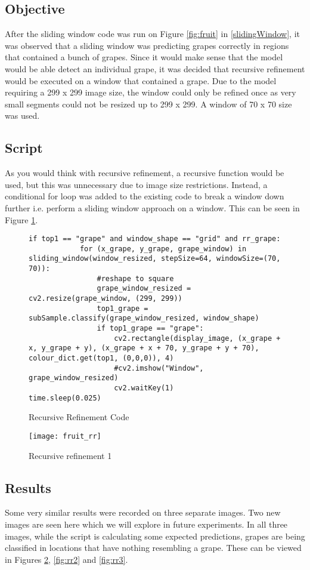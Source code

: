 \tocless\subsection{Objective}
After the sliding window code was run on Figure \ref{fig:fruit} in \ref{slidingWindow},
it was observed that a sliding window was predicting grapes correctly in
regions that contained a bunch of grapes. Since it would make sense that the
model would be able detect an individual grape, it was decided that
recursive refinement would be executed on a window that contained a grape. Due to the model
requiring a 299 x 299 image size, the window could only be refined once as
very small segments could not be resized up to 299 x 299. A window of 70 x 70 size was used.

\tocless\subsection{Script}
As you would think with recursive refinement, a recursive function would be used,
but this was unnecessary due to image size restrictions. Instead, a
conditional for loop was added to the existing code to break a window down further i.e. perform a sliding window approach on a window.
This can be seen in Figure \ref{lst:rrCode1}.

\begin{figure}[h]
\caption{Recursive Refinement Code}
\label{lst:rrCode1}
\begin{lstlisting}[style=Python]
if top1 == "grape" and window_shape == "grid" and rr_grape:
			for (x_grape, y_grape, grape_window) in sliding_window(window_resized, stepSize=64, windowSize=(70, 70)):
				#reshape to square
				grape_window_resized = cv2.resize(grape_window, (299, 299))
				top1_grape = subSample.classify(grape_window_resized, window_shape)
				if top1_grape == "grape":
					cv2.rectangle(display_image, (x_grape + x, y_grape + y), (x_grape + x + 70, y_grape + y + 70), colour_dict.get(top1, (0,0,0)), 4)
					#cv2.imshow("Window", grape_window_resized)
					cv2.waitKey(1)
time.sleep(0.025)
\end{lstlisting}
\end{figure}

\begin{figure}[h]
\centering
    \texttt{[image: fruit\_rr]}
      \caption{Recursive refinement 1}
      \label{fig:rr1}
\end{figure}

\tocless\subsection{Results}
Some very similar results were recorded on three separate images. Two new images are seen
here which we will explore in future experiments. In all three images, while the script
is calculating some expected predictions, grapes are being classified in locations
that have nothing resembling a grape. These can be viewed in Figures
\ref{fig:rr1}, \ref{fig:rr2} and \ref{fig:rr3}.

